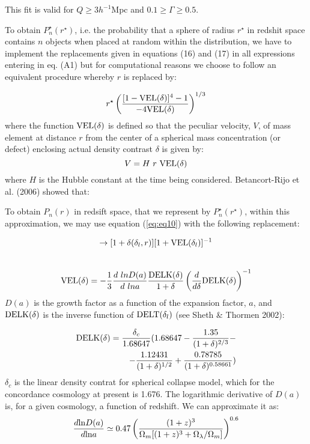 This fit is valid for $Q\geq 3 h^{-1}$Mpc and $0.1 \geq \Gamma \geq 0.5$.

To obtain $P^{\star}_n(r^{\star})$, i.e. the probability that a sphere of radius $r^{\star}$ in redshit space contains $n$ objects when placed at random within the distribution, we have to implement the replacements given in equations (16) and (17) in all expressions entering in eq. (A1) but for computational reasons we choose to follow an equivalent procedure whereby $r$ is replaced by:

\begin{equation}
r^{\star} \left( \frac{[1-{\rm VEL}(\delta)]^4 - 1}{-4 {\rm VEL}(\delta)}\right)^{1/3}    \label{eq:eqA9}
\end{equation}
where the function ${\rm VEL}(\delta)$ is defined so that the peculiar velocity, $V$, of mass element at distance $r$ from the center of a spherical mass concentration (or defect) enclosing actual density contrast $\delta$ is given by: 
\begin{equation}
V = H~r~ {\rm VEL}(\delta)   \label{eq:eqA10}  
\end{equation}
where $H$ is the Hubble constant at the time being considered.
Betancort-Rijo et al. (2006) showed that:

To obtain $P_n(r)$ in redsift space, that we represent by $P^{\star}_{n}(r^{\star})$, within this approximation, we may use equation (\ref{eq:eq10}) with the following replacement:  

\begin{equation} 
[1+\delta(\delta_{l},r)] \rightarrow [1+\delta(\delta_{l},r)][1+{\rm VEL}(\delta_{l})]^{-1}  \label{eq:eq20} 
\end{equation}  
\\  

\begin{equation}
{\rm VEL}(\delta) = -\frac{1}{3} \frac{d~ln D(a)}{d~ln a} \frac{{\rm DELK}(\delta)}{1+\delta} \left( \frac{d}{d\delta} {\rm DELK}(\delta) \right)^{-1}   \label{eq:eqA11}
\end{equation}
$D(a)$ is the growth factor as a function of the expansion factor, $a$, and ${\rm DELK}(\delta)$ is the inverse function of ${\rm DELT}(\delta_l)$ 
(see Sheth \& Thormen 2002):

\begin{eqnarray}
{\rm DELK}(\delta) = \frac{\delta_c}{1.68647} ( 1.68647 - \frac{1.35}{(1+\delta)^{2/3}} - \nonumber \\
- \frac{1.12431}{(1+\delta)^{1/2}} + \frac{0.78785}{(1+\delta)^{0.58661}} )    \label{eq:eqA12}
\end{eqnarray}
$\delta_c$ is the linear density contrat for spherical collapse model, which for the concordance cosmology at present is 1.676. 
The logarithmic derivative of $D(a)$ is, for a given cosmology, a function of redshift. We can approximate it as:
\begin{equation}
\frac{d {\rm ln}D(a)}{d {\rm ln} a} \simeq 0.47 \left(\frac{(1+z)^{3}}{\Omega_{m}[(1+z)^{3}+\Omega_{\lambda}/\Omega_{m}]} \right)^{0.6}
\end{equation}

